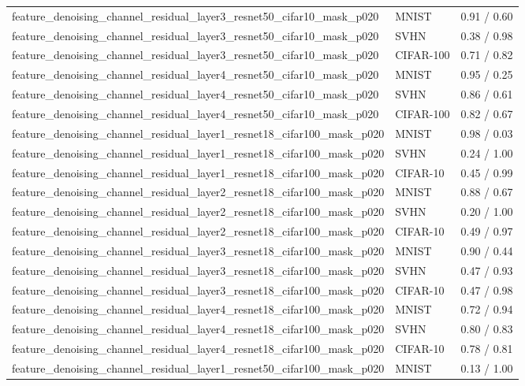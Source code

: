 \begin{tabular}{lll}
feature\_denoising\_channel\_residual\_layer3\_resnet50\_cifar10\_mask\_p020 & MNIST & 0.91 / 0.60 \\
feature\_denoising\_channel\_residual\_layer3\_resnet50\_cifar10\_mask\_p020 & SVHN & 0.38 / 0.98 \\
feature\_denoising\_channel\_residual\_layer3\_resnet50\_cifar10\_mask\_p020 & CIFAR-100 & 0.71 / 0.82 \\
feature\_denoising\_channel\_residual\_layer4\_resnet50\_cifar10\_mask\_p020 & MNIST & 0.95 / 0.25 \\
feature\_denoising\_channel\_residual\_layer4\_resnet50\_cifar10\_mask\_p020 & SVHN & 0.86 / 0.61 \\
feature\_denoising\_channel\_residual\_layer4\_resnet50\_cifar10\_mask\_p020 & CIFAR-100 & 0.82 / 0.67 \\
feature\_denoising\_channel\_residual\_layer1\_resnet18\_cifar100\_mask\_p020 & MNIST & 0.98 / 0.03 \\
feature\_denoising\_channel\_residual\_layer1\_resnet18\_cifar100\_mask\_p020 & SVHN & 0.24 / 1.00 \\
feature\_denoising\_channel\_residual\_layer1\_resnet18\_cifar100\_mask\_p020 & CIFAR-10 & 0.45 / 0.99 \\
feature\_denoising\_channel\_residual\_layer2\_resnet18\_cifar100\_mask\_p020 & MNIST & 0.88 / 0.67 \\
feature\_denoising\_channel\_residual\_layer2\_resnet18\_cifar100\_mask\_p020 & SVHN & 0.20 / 1.00 \\
feature\_denoising\_channel\_residual\_layer2\_resnet18\_cifar100\_mask\_p020 & CIFAR-10 & 0.49 / 0.97 \\
feature\_denoising\_channel\_residual\_layer3\_resnet18\_cifar100\_mask\_p020 & MNIST & 0.90 / 0.44 \\
feature\_denoising\_channel\_residual\_layer3\_resnet18\_cifar100\_mask\_p020 & SVHN & 0.47 / 0.93 \\
feature\_denoising\_channel\_residual\_layer3\_resnet18\_cifar100\_mask\_p020 & CIFAR-10 & 0.47 / 0.98 \\
feature\_denoising\_channel\_residual\_layer4\_resnet18\_cifar100\_mask\_p020 & MNIST & 0.72 / 0.94 \\
feature\_denoising\_channel\_residual\_layer4\_resnet18\_cifar100\_mask\_p020 & SVHN & 0.80 / 0.83 \\
feature\_denoising\_channel\_residual\_layer4\_resnet18\_cifar100\_mask\_p020 & CIFAR-10 & 0.78 / 0.81 \\
feature\_denoising\_channel\_residual\_layer1\_resnet50\_cifar100\_mask\_p020 & MNIST & 0.13 / 1.00 \\

\end{tabular}
